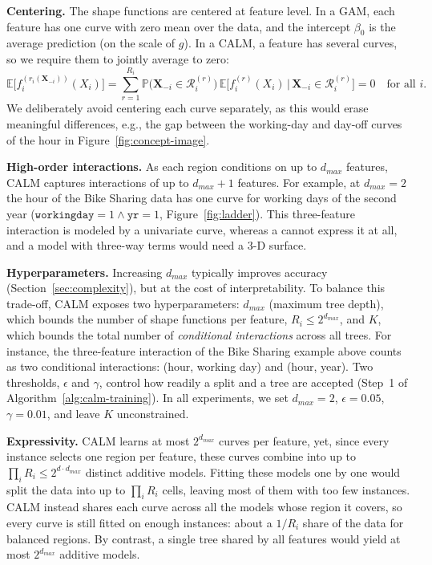 \textbf{Centering.}
The shape functions are centered at feature level.
In a GAM, each feature has one curve with zero mean over the data, and the intercept $\beta_0$ is the average prediction (on the scale of $g$).
In a CALM, a feature has several curves, so we require them to jointly average to zero:
\begin{equation}
\label{eq:centering-main}
\mathbb{E}\big[f_i^{(r_i(\mathbf{X}_{-i}))}(X_i)\big]
= \sum_{r=1}^{R_i} \mathbb{P}\big(\mathbf{X}_{-i}\in\mathcal{R}_i^{(r)}\big)\,
\mathbb{E}\big[f_i^{(r)}(X_i)\,\big|\,\mathbf{X}_{-i}\in\mathcal{R}_i^{(r)}\big] = 0
\quad \text{for all } i.
\end{equation}
We deliberately avoid centering each curve separately, as this would erase meaningful differences, e.g., the gap between the working-day and day-off curves of the hour in Figure~\ref{fig:concept-image}.

\textbf{High-order interactions.}
As each region conditions on up to $d_{max}$ features, CALM captures interactions of up to $d_{max}+1$ features.
For example, at $d_{max}=2$ the hour of the Bike Sharing data has one curve for working days of the second year ($\mathtt{workingday}=1 \wedge \mathtt{yr}=1$, Figure~\ref{fig:ladder}).
This three-feature interaction is modeled by a univariate curve, whereas a \gamm{} cannot express it at all, and a model with three-way terms would need a 3-D surface.

\textbf{Hyperparameters.}
Increasing $d_{max}$ typically improves accuracy (Section~\ref{sec:complexity}), but at the cost of interpretability.
To balance this trade-off, CALM exposes two hyperparameters: $d_{max}$ (maximum tree depth), which bounds the number of shape functions per feature, $R_i \leq 2^{d_{max}}$, and $K$, which bounds the total number of \emph{conditional interactions} across all trees.
For instance, the three-feature interaction of the Bike Sharing example above counts as two conditional interactions: (hour, working day) and (hour, year).
Two thresholds, $\epsilon$ and $\gamma$, control how readily a split and a tree are accepted (Step~1 of Algorithm~\ref{alg:calm-training}).
In all experiments, we set $d_{max} = 2$, $\epsilon = 0.05$, $\gamma = 0.01$, and leave $K$ unconstrained.

\textbf{Expressivity.}
CALM learns at most $2^{d_{max}}$ curves per feature, yet, since every instance selects one region per feature, these curves combine into up to $\prod_{i} R_i \leq 2^{d\cdot d_{max}}$ distinct additive models.
Fitting these models one by one would split the data into up to $\prod_{i} R_i$ cells, leaving most of them with too few instances. CALM instead shares each curve across all the models whose region it covers, so every curve is still fitted on enough instances: about a $1/R_i$ share of the data for balanced regions.
By contrast, a single tree shared by all features would yield at most $2^{d_{max}}$ additive models.


